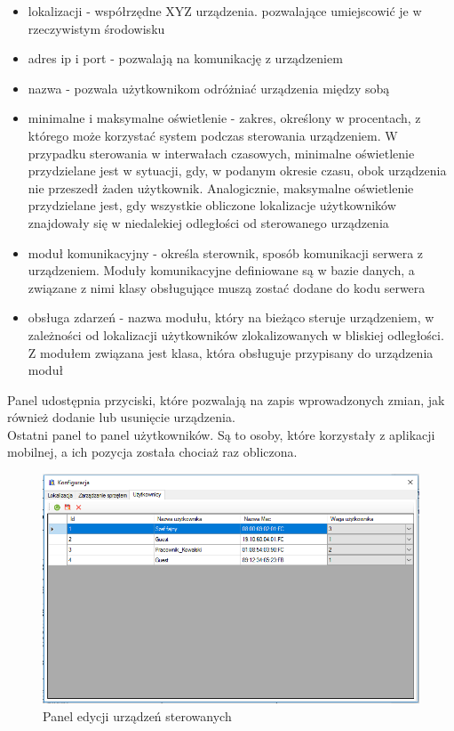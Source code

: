 \begin{itemize}
	\item lokalizacji - współrzędne XYZ urządzenia. pozwalające umiejscowić je w rzeczywistym środowisku
	\item adres ip i port - pozwalają na komunikację z urządzeniem
	\item nazwa - pozwala użytkownikom odróżniać urządzenia między sobą
	\item minimalne i maksymalne oświetlenie - zakres, określony w procentach, z którego może korzystać system podczas sterowania urządzeniem. W przypadku sterowania w interwałach czasowych, minimalne oświetlenie przydzielane jest w sytuacji, gdy, w podanym okresie czasu, obok urządzenia nie przeszedł żaden użytkownik. Analogicznie, maksymalne oświetlenie przydzielane jest, gdy wszystkie obliczone lokalizacje użytkowników znajdowały się w niedalekiej odległości od sterowanego urządzenia
	\item moduł komunikacyjny - określa sterownik, sposób komunikacji serwera z urządzeniem. Moduły komunikacyjne definiowane są w bazie danych, a związane z nimi klasy obsługujące muszą zostać dodane do kodu serwera
	\item obsługa zdarzeń - nazwa modułu, który na bieżąco steruje urządzeniem, w zależności od lokalizacji użytkowników zlokalizowanych w bliskiej odległości. Z modułem związana jest klasa, która obsługuje przypisany do urządzenia moduł
\end{itemize}
Panel udostępnia przyciski, które pozwalają na zapis wprowadzonych zmian, jak również dodanie lub usunięcie urządzenia.\\
Ostatni panel to panel użytkowników. Są to osoby, które korzystały z aplikacji mobilnej, a ich pozycja została chociaż raz obliczona.
\begin{figure}[H]			
	\centering
	\caption{Panel edycji urządzeń sterowanych}
	\includegraphics[width=1.0\textwidth]{panel_konf_users}
\end{figure}
